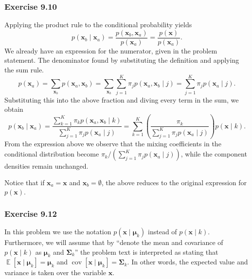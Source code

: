 \documentclass[12pt, a4paper]{article}
\newcommand{\vect}[1]{\bm{#1}}
\DeclareMathOperator{\E}{\mathbb{E}}
\DeclareMathOperator{\cov}{\operatorname{cov}}
\begin{document}
\subsubsection*{Exercise 9.10}
Applying the product rule to the conditional probability yields
\begin{equation*}
	p(\vect{x}_b \mid \vect{x}_a) = 
	\frac{p(\vect{x}_b, \vect{x}_a)}{p(\vect{x}_a)} 
	=
	\frac{p(\vect{x})}{p(\vect{x}_a)}.
\end{equation*}
We already have an expression for the numerator, given in the problem statement.
The denominator found by substituting the definition and applying the sum rule.
\begin{equation*}
	p(\vect{x}_a)
	=
	\sum_{\vect{x}_b} p(\vect{x}_a, \vect{x}_b)
	= \sum_{\vect{x}_b} \sum_{j=1}^{K} \pi_j p( \vect{x}_a, \vect{x}_b \mid j )
	=
	 \sum_{j=1}^{K} \pi_j  p( \vect{x}_a \mid j ).
\end{equation*}
Substituting this into the above fraction and diving every term in the sum,
we obtain
\begin{equation*}
	p(\vect{x}_b \mid \vect{x}_a) = 
	\frac{\sum_{k=1}^{K} \pi_k  p( \vect{x}_a, \vect{x}_b \mid k )}
	{\sum_{j=1}^{K} \pi_j  p( \vect{x}_a \mid j )}
	= \sum_{k=1}^{K} \left( \frac{\pi_k}{\sum_{j=1}^{K} \pi_j  p( \vect{x}_a \mid j )} \right)  p( \vect{x} \mid k ).
\end{equation*}
From the expression above we observe that the mixing coefficients in the conditional distribution become $\pi_k / \left( \sum_{j=1}^{K} \pi_j  p( \vect{x}_a \mid j ) \right)$, while the component densities remain unchanged.

Notice that if $\vect{x}_a = \vect{x}$ and $\vect{x}_b = \emptyset$, the above reduces to the original expression for $p(\vect{x})$.


\subsubsection*{Exercise 9.12}
In this problem we use the notation $p (\vect{x} \mid \vect{\mu}_k)$ instead of $p (\vect{x} \mid k)$.
Furthermore, we will assume that by ``denote the mean and covariance of $p (\vect{x} \mid k)$ as $\vect{\mu}_k$ and $\vect{\Sigma}_k$'' the problem text is interpreted as stating that 
$\E \left[ \vect{x} \mid \vect{\mu}_k \right] = \vect{\mu}_k$
and
$\cov \left[ \vect{x} \mid \vect{\mu}_k \right] = \vect{\Sigma}_k$.
In other words, the expected value and variance is taken over the variable $\vect{x}$.
\end{document}

